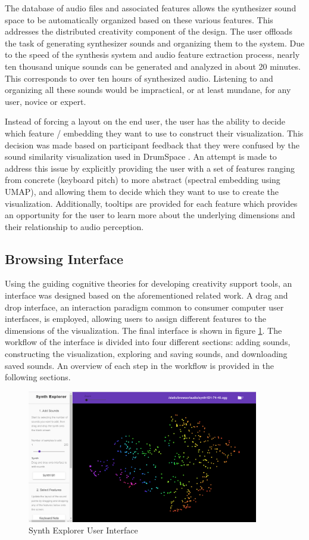 The database of audio files and associated features allows the synthesizer sound space to be automatically organized based on these various features. This addresses the distributed creativity component of the design. The user offloads the task of generating synthesizer sounds and organizing them to the system. Due to the speed of the synthesis system and audio feature extraction process, nearly ten thousand unique sounds can be generated and analyzed in about 20 minutes. This corresponds to over ten hours of synthesized audio. Listening to and organizing all these sounds would be impractical, or at least mundane, for any user, novice or expert. 

Instead of forcing a layout on the end user, the user has the ability to decide which feature / embedding they want to use to construct their visualization. This decision was made based on participant feedback that they were confused by the sound similarity visualization used in DrumSpace \cite{turquois2016exploring}. An attempt is made to address this issue by explicitly providing the user with a set of features ranging from concrete (keyboard pitch) to more abstract (spectral embedding using UMAP), and allowing them to decide which they want to use to create the visualization. Additionally, tooltips are provided for each feature which provides an opportunity for the user to learn more about the underlying dimensions and their relationship to audio perception.

\subsection{Browsing Interface}
Using the guiding cognitive theories for developing creativity support tools, an interface was designed based on the aforementioned related work. A drag and drop interface, an interaction paradigm common to consumer computer user interfaces, is employed, allowing users to assign different features to the dimensions of the visualization. The final interface is shown in figure \ref{fig:ui_1}. %
The workflow of the interface is divided into four different sections: adding sounds, constructing the visualization, exploring and saving sounds, and downloading saved sounds. An overview of each step in the workflow is provided in the following sections.
\begin{figure}
    \centering
    \includegraphics[width=0.9\textwidth]{SynthExplore Init.png}
    \caption{Synth Explorer User Interface}
    \label{fig:ui_1}
\end{figure}

